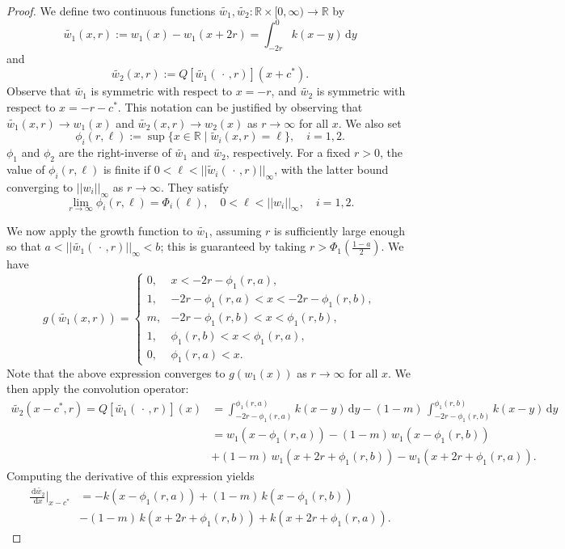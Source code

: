 \documentclass[11pt]{article}
\theoremstyle{definition}
\numberwithin{equation}{section}
\numberwithin{thm}{section}
\newcommand{\wone}{w_1}
\newcommand{\wtwo}{w_2}
\renewcommand{\a}{a}
\renewcommand{\b}{b}
\newcommand{\m}{m}
\newcommand{\blank}{\,\cdot\,}
\newcommand{\what}{\tilde{\wone}}
\newcommand{\whattwo}{\tilde{\wtwo}}
\newcommand{\whatgen}{\tilde{w}}
\renewcommand{\d}{\,\mathrm{d}}
\newcommand{\D}[1]{\frac{\d #1}{\d x}}
\begin{document}
\begin{proof}
We define two continuous functions $\what,\whattwo : \mathbb R \times [0,\infty)\to\mathbb R$ by
\begin{equation}
\what(x,r) := w_1(x) - w_1(x+2r) = \int_{-2r}^{0} k(x-y) \d y
\end{equation}
and
\begin{equation}
\whattwo(x,r) := Q[\what(\blank,r)](x+c^*).
\end{equation}
Observe that $\what$ is symmetric with respect to $x=-r$, and $\whattwo$ is symmetric with respect to $x=-r-c^*$.
This notation can be justified by observing that $\what(x,r) \to w_1(x)$ and $\whattwo(x,r)\to w_2(x)$ as $r\to\infty$ for all $x$.
We also set
\begin{equation}
\phi_i(r,\ell) := \sup \{ x \in \mathbb R \mid \whatgen_i(x,r) = \ell \}, \quad i=1,2.
\end{equation}
$\phi_1$ and $\phi_2$ are the right-inverse of $\what$ and $\whattwo$, respectively.
For a fixed $r>0$, the value of $\phi_i(r,\ell)$ is finite if $0 < \ell < || \whatgen_i(\blank, r) || _\infty$, with the latter bound converging to $||w_i||_\infty$ as $r\to\infty$.
They satisfy
$$
\lim_{r\to\infty} \phi_i (r,\ell) = \Phi_i(\ell) , \quad 0 < \ell < || w_i ||_\infty, \quad i=1,2.
$$

We now apply the growth function to $\what$, assuming $r$ is sufficiently large enough so that $\a < ||\what(\blank,r)||_\infty < \b$; this is guaranteed by taking $r > \Phi_1\left(\frac{1-a}{2}\right)$.
We have
$$
g\left(\what(x,r)\right) = \begin{cases}
0, & x < -2r - \phi_1(r,a), \\
1, & -2r - \phi_1(r,a) < x < -2r - \phi_1(r,b), \\
\m, & -2r - \phi_1(r,b) < x < \phi_1(r,b),\\
1, & \phi_1(r,b) < x < \phi_1(r,a), \\
0, & \phi_1(r,a) < x.
\end{cases} $$
Note that the above expression converges to $g(w_1(x))$ as $r\to\infty$ for all $x$.
We then apply the convolution operator:
$$\begin{aligned} 
\whattwo(x-c^*,r) = Q[\what(\blank,r)](x) &= \int_{-2r-\phi_1(r,a)}^{\phi_1(r,a)} k(x-y) \d y - (1-\m)\, \int_{-2r-\phi_1(r,b)}^{\phi_1(r,b)} k(x-y) \d y \\
&= w_1(x-\phi_1(r,a)) - (1-\m)\, w_1(x-\phi_1(r,b)) \\
&+ (1-\m)\, w_1(x+2r+\phi_1(r,b)) - w_1(x+2r+\phi_1(r,a)).
\end{aligned}$$
Computing the derivative of this expression yields
$$\begin{aligned} \label{qhatcomputation2}
\D{\whattwo}\Big|_{x-c^*} &= -k(x-\phi_1(r,a)) + (1-\m)\, k(x-\phi_1(r,b)) \\
& - (1-\m)\, k(x+2r+\phi_1(r,b)) + k(x+2r+\phi_1(r,a)).
\end{aligned}$$


\end{proof}
\end{document}
